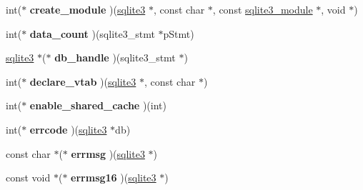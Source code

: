 \begin{DoxyCompactItemize}
\item 
\hypertarget{structsqlite3__api__routines_a25834b37191417562ecd2ee67b85617b}{int($\ast$ {\bfseries create\-\_\-module} )(\hyperlink{structsqlite3}{sqlite3} $\ast$, const char $\ast$, const \hyperlink{structsqlite3__module}{sqlite3\-\_\-module} $\ast$, void $\ast$)}\label{structsqlite3__api__routines_a25834b37191417562ecd2ee67b85617b}

\item 
\hypertarget{structsqlite3__api__routines_aea0a7b7483770202ef9eae88b4eb70cd}{int($\ast$ {\bfseries data\-\_\-count} )(sqlite3\-\_\-stmt $\ast$p\-Stmt)}\label{structsqlite3__api__routines_aea0a7b7483770202ef9eae88b4eb70cd}

\item 
\hypertarget{structsqlite3__api__routines_a243ede93aa98a2a339cdd693ca2855e1}{\hyperlink{structsqlite3}{sqlite3} $\ast$($\ast$ {\bfseries db\-\_\-handle} )(sqlite3\-\_\-stmt $\ast$)}\label{structsqlite3__api__routines_a243ede93aa98a2a339cdd693ca2855e1}

\item 
\hypertarget{structsqlite3__api__routines_a6b6035b36ea9d0800181e69e20059b32}{int($\ast$ {\bfseries declare\-\_\-vtab} )(\hyperlink{structsqlite3}{sqlite3} $\ast$, const char $\ast$)}\label{structsqlite3__api__routines_a6b6035b36ea9d0800181e69e20059b32}

\item 
\hypertarget{structsqlite3__api__routines_a3e6b7bbdd68cde43ef4afffd73e957ea}{int($\ast$ {\bfseries enable\-\_\-shared\-\_\-cache} )(int)}\label{structsqlite3__api__routines_a3e6b7bbdd68cde43ef4afffd73e957ea}

\item 
\hypertarget{structsqlite3__api__routines_a0f1cf42108e6d872d03b78eaf27dfc45}{int($\ast$ {\bfseries errcode} )(\hyperlink{structsqlite3}{sqlite3} $\ast$db)}\label{structsqlite3__api__routines_a0f1cf42108e6d872d03b78eaf27dfc45}

\item 
\hypertarget{structsqlite3__api__routines_a8cc92411b7513a1009db9cc75bc486f5}{const char $\ast$($\ast$ {\bfseries errmsg} )(\hyperlink{structsqlite3}{sqlite3} $\ast$)}\label{structsqlite3__api__routines_a8cc92411b7513a1009db9cc75bc486f5}

\item 
\hypertarget{structsqlite3__api__routines_a86767e26b770626fb788af5c7a75af9b}{const void $\ast$($\ast$ {\bfseries errmsg16} )(\hyperlink{structsqlite3}{sqlite3} $\ast$)}\label{structsqlite3__api__routines_a86767e26b770626fb788af5c7a75af9b}


\end{DoxyCompactItemize}
